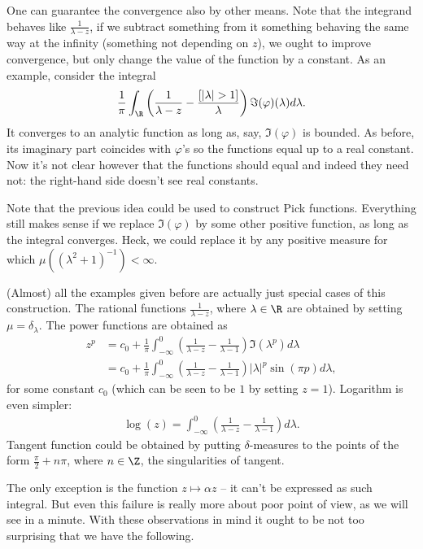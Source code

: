 One can guarantee the convergence also by other means. Note that the integrand behaves like $\frac{1}{\lambda - z}$, if we subtract something from it something behaving the same way at the infinity (something not depending on $z$), we ought to improve convergence, but only change the value of the function by a constant. As an example, consider the integral
\begin{align}\label{easy_pick_repr}
	\frac{1}{\pi}\int_{\R} \left(\frac{1}{\lambda - z} - \frac{[|\lambda| > 1]}{\lambda} \right) \Im(\varphi)(\lambda)d \lambda.
\end{align}
It converges to an analytic function as long as, say, $ \Im(\varphi)$ is bounded. As before, its imaginary part coincides with $\varphi$'s so the functions equal up to a real constant. Now it's not clear however that the functions should equal and indeed they need not: the right-hand side doesn't see real constants.

Note that the previous idea could be used to construct Pick functions. Everything still makes sense if we replace $\Im(\varphi)$ by some other positive function, as long as the integral converges. Heck, we could replace it by any positive measure for which $\mu((\lambda^2 + 1)^{-1}) < \infty$.

(Almost) all the examples given before are actually just special cases of this construction. The rational functions $\frac{1}{\lambda - z}$, where $\lambda \in \R$ are obtained by setting $\mu = \delta_{\lambda}$. The power functions are obtained as
\begin{align*}
	z^{p} &= c_{0} + \frac{1}{\pi}\int_{-\infty}^{0} \left(\frac{1}{\lambda - z} - \frac{1}{\lambda - 1}\right) \Im(\lambda^{p}) d \lambda \\
	&= c_{0} + \frac{1}{\pi}\int_{-\infty}^{0} \left(\frac{1}{\lambda - z} - \frac{1}{\lambda - 1}\right) |\lambda|^{p} \sin(\pi p) d \lambda,
\end{align*}
for some constant $c_{0}$ (which can be seen to be $1$ by setting $z = 1$). Logarithm is even simpler:
\begin{align*}
	\log(z) = \int_{-\infty}^{0} \left(\frac{1}{\lambda - z} - \frac{1}{\lambda - 1}\right) d \lambda.
\end{align*}
Tangent function could be obtained by putting $\delta$-measures to the points of the form $\frac{\pi}{2} + n \pi$, where $n \in \Z$, the singularities of tangent.

The only exception is the function $z \mapsto \alpha z$ -- it can't be expressed as such integral. But even this failure is really more about poor point of view, as we will see in a minute. With these observations in mind it ought to be not too surprising that we have the following.

